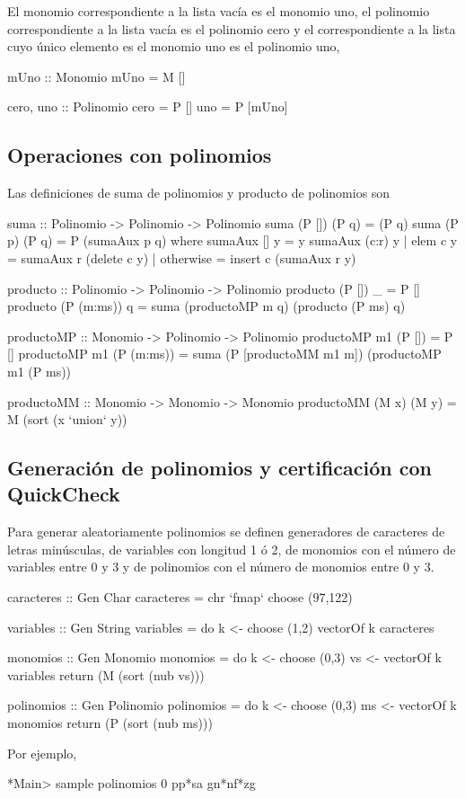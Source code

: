 \documentclass{llncs}
\begin{document}
El monomio correspondiente a la lista vacía es el monomio uno, el polinomio
correspondiente a la lista vacía es el polinomio cero y el correspondiente a
la lista cuyo único elemento es el monomio uno es el polinomio uno,
\begin{code}
mUno :: Monomio
mUno = M []

cero, uno  :: Polinomio
cero = P []
uno = P [mUno]
\end{code}

\subsection{Operaciones con polinomios}

Las definiciones de suma de polinomios y producto de polinomios son
\begin{code}
suma :: Polinomio -> Polinomio -> Polinomio
suma (P []) (P q) = (P q)
suma (P p)  (P q) = P (sumaAux p q)
   where sumaAux [] y      = y
         sumaAux (c:r) y
             | elem c y   = sumaAux r (delete c y)
             | otherwise  = insert c (sumaAux r y)

producto :: Polinomio -> Polinomio -> Polinomio
producto (P []) _     = P []
producto (P (m:ms)) q = suma (productoMP m q) (producto (P ms) q)

productoMP :: Monomio -> Polinomio -> Polinomio
productoMP m1 (P [])     = P []
productoMP m1 (P (m:ms)) = 
   suma (P [productoMM m1 m]) (productoMP m1 (P ms))

productoMM :: Monomio -> Monomio -> Monomio
productoMM (M x) (M y) = M (sort (x `union` y))
\end{code}

\subsection{Generación de polinomios y certificación con QuickCheck}
Para generar aleatoriamente polinomios se definen generadores de caracteres
de letras minúsculas, de variables con longitud 1 ó 2, de monomios con el
número de variables entre 0 y 3 y de polinomios con el número de monomios
entre 0 y 3. 
\begin{code}
caracteres :: Gen Char
caracteres = chr `fmap` choose (97,122)

variables :: Gen String
variables = do k <- choose (1,2)
               vectorOf k caracteres

monomios :: Gen Monomio
monomios = do k <- choose (0,3)
              vs <- vectorOf k variables
              return (M (sort (nub vs)))

polinomios :: Gen Polinomio
polinomios = do k <- choose (0,3)
                ms <- vectorOf k monomios
                return (P (sort (nub ms)))
\end{code}
Por ejemplo,
\begin{sesion}
*Main> sample polinomios
0
pp*sa
gn*nf*zg
\end{sesion}
\end{document}
